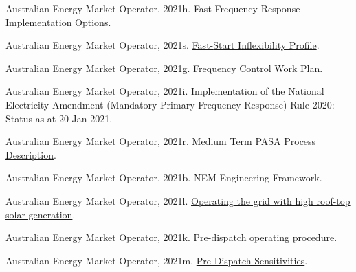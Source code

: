 \documentclass[12pt,a4paper,]{report}
\newlength{\cslhangindent}
\newenvironment{CSLReferences}[2] %
 {%
  \setlength{\parindent}{0pt}
  \ifodd #1 \everypar{\setlength{\hangindent}{\cslhangindent}}\ignorespaces\fi
  \ifnum #2 > 0
  \setlength{\parskip}{#2\baselineskip}
  \fi
 }%
 {}
\begin{document}
\begin{CSLReferences}{1}{0}
\leavevmode{}%
Australian Energy Market Operator, 2021h. Fast {Frequency Response
Implementation Options}.

\leavevmode{}%
Australian Energy Market Operator, 2021s.
\href{https://aemo.com.au/-/media/files/electricity/nem/security_and_reliability/dispatch/policy_and_process/fast-start-unit-inflexibility-profile.pdf}{Fast-{Start
Inflexibility Profile}}.

\leavevmode{}%
Australian Energy Market Operator, 2021g. Frequency {Control Work Plan}.

\leavevmode{}%
Australian Energy Market Operator, 2021i. Implementation of the
{National Electricity Amendment} ({Mandatory Primary Frequency
Response}) {Rule} 2020: {Status} as at 20 {Jan} 2021.

\leavevmode{}%
Australian Energy Market Operator, 2021r.
\href{https://aemo.com.au/-/media/files/electricity/nem/planning_and_forecasting/pasa/mt-pasa-process-description-v62.pdf?la=en}{Medium
{Term PASA Process Description}}.

\leavevmode{}%
Australian Energy Market Operator, 2021b. {NEM Engineering Framework}.

\leavevmode{}%
Australian Energy Market Operator, 2021l.
\href{https://www.aemo.com.au/-/media/files/electricity/nem/security_and_reliability/power_system_ops/consumer-fact-sheet.pdf}{Operating
the grid with high roof-top solar generation}.

\leavevmode{}%
Australian Energy Market Operator, 2021k.
\href{https://www.aemo.com.au/-/media/files/electricity/nem/security_and_reliability/power_system_ops/procedures/so_op_3704-predispatch.pdf?la=en}{Pre-dispatch
operating procedure}.

\leavevmode{}%
Australian Energy Market Operator, 2021m.
\href{https://www.aemo.com.au/-/media/files/electricity/nem/security_and_reliability/dispatch/policy_and_process/pre-dispatch-sensitivities.pdf}{Pre-{Dispatch
Sensitivities}}.


\end{CSLReferences}
\end{document}
